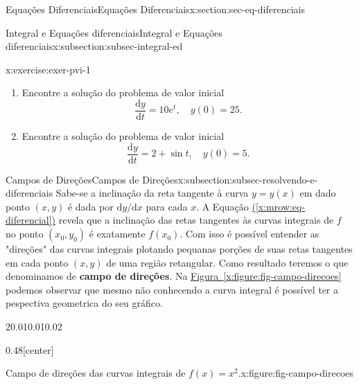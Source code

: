 \documentclass[oneside,10pt,]{article}
\newcommand{\xreffont}{\relax}
\newcommand{\terminology}[1]{\textbf{#1}}
\numberwithin{equation}{section}
\newcommand{\dd}{\mathrm{d}}
\begin{document}
\begin{sectionptx}{Equações Diferenciais}{}{Equações Diferenciais}{}{}{x:section:sec-eq-diferenciais}
\begin{subsectionptx}{Integral e Equações diferenciais}{}{Integral e Equações diferenciais}{}{}{x:subsection:subsec-integral-ed}
\begin{inlineexercise}{}{x:exercise:exer-pvi-1}
\begin{enumerate}[font=\bfseries,label=(\alph*),ref=\alph*]
\item{}Encontre a solução do problema de valor inicial%
\begin{equation*}
\frac{\dd y}{\dd t}=10e^t, \quad y(0)=25\text{.}
\end{equation*}
%
\item{}Encontre a solução do problema de valor inicial%
\begin{equation*}
\frac{\dd y}{\dd t} = 2+ \sin{t}, \quad  y(0)=5\text{.}
\end{equation*}
%
\end{enumerate}
\end{inlineexercise}
\end{subsectionptx}
%
%
\typeout{************************************************}
\typeout{************************************************}
%
\begin{subsectionptx}{Campos de Direções}{}{Campos de Direções}{}{}{x:subsection:subsec-resolvendo-e-diferenciais}
Sabe-se  a inclinação da reta tangente à curva  \(y=y(x)\) em dado ponto \((x, y)\) é dada por \(\dd y/\dd x\) para cada \(x\). A Equação \hyperref[x:mrow:eq-diferencial]{({\xreffont\ref{x:mrow:eq-diferencial}})} revela que a inclinação das retas tangentes às curvas integrais de \(f\) no ponto \((x_0, y_0)\) é exatamente  \(f(x_0)\). Com isso é possível entender as "direções" das curvas integrais plotando pequanas porções de suas retas tangentes em cada ponto \((x,y)\)  de uma região retangular. Como resultado teremos o que denominamos de \terminology{campo de direções}. Na \hyperref[x:figure:fig-campo-direcoes]{Figura~{\xreffont\ref{x:figure:fig-campo-direcoes}}\textendash{}{\xreffont\ref{x:figure:fig-campo-direcoes-curva}}} podemos observar que  mesmo não conhecendo a curva integral é possível ter a pespectiva geometrica do seu gráfico.%
\begin{sidebyside}{2}{0.01}{0.01}{0.02}%
\begin{sbspanel}{0.48}[center]%
\begin{figureptx}{Campo de direções das curvas integrais de \(f(x)=x^2\).}{x:figure:fig-campo-direcoes}{}%
%

\end{figureptx}
\end{sbspanel}
\end{sidebyside}
\end{subsectionptx}
\end{sectionptx}
\end{document}

